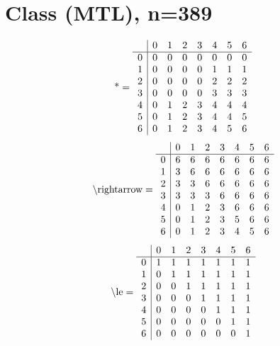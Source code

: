 \documentclass[11pt]{article}
\begin{document}
\section{Class (MTL), n=389}
\[\text{*} = 
\begin{array}{r | r r r r r r r}
 & 0 & 1 & 2 & 3 & 4 & 5 & 6 \\ \hline
0 & 0 & 0 & 0 & 0 & 0 & 0 & 0 \\
1 & 0 & 0 & 0 & 0 & 1 & 1 & 1 \\
2 & 0 & 0 & 0 & 0 & 2 & 2 & 2 \\
3 & 0 & 0 & 0 & 0 & 3 & 3 & 3 \\
4 & 0 & 1 & 2 & 3 & 4 & 4 & 4 \\
5 & 0 & 1 & 2 & 3 & 4 & 4 & 5 \\
6 & 0 & 1 & 2 & 3 & 4 & 5 & 6 \\
\end{array}
\]
\[\text{\textbackslash rightarrow} = 
\begin{array}{r | r r r r r r r}
 & 0 & 1 & 2 & 3 & 4 & 5 & 6 \\ \hline
0 & 6 & 6 & 6 & 6 & 6 & 6 & 6 \\
1 & 3 & 6 & 6 & 6 & 6 & 6 & 6 \\
2 & 3 & 3 & 6 & 6 & 6 & 6 & 6 \\
3 & 3 & 3 & 3 & 6 & 6 & 6 & 6 \\
4 & 0 & 1 & 2 & 3 & 6 & 6 & 6 \\
5 & 0 & 1 & 2 & 3 & 5 & 6 & 6 \\
6 & 0 & 1 & 2 & 3 & 4 & 5 & 6 \\
\end{array}
\]
\[\text{\textbackslash le} = 
\begin{array}{r | r r r r r r r}
 & 0 & 1 & 2 & 3 & 4 & 5 & 6 \\ \hline
0 & 1 & 1 & 1 & 1 & 1 & 1 & 1 \\
1 & 0 & 1 & 1 & 1 & 1 & 1 & 1 \\
2 & 0 & 0 & 1 & 1 & 1 & 1 & 1 \\
3 & 0 & 0 & 0 & 1 & 1 & 1 & 1 \\
4 & 0 & 0 & 0 & 0 & 1 & 1 & 1 \\
5 & 0 & 0 & 0 & 0 & 0 & 1 & 1 \\
6 & 0 & 0 & 0 & 0 & 0 & 0 & 1 \\
\end{array}
\]
\end{document}
